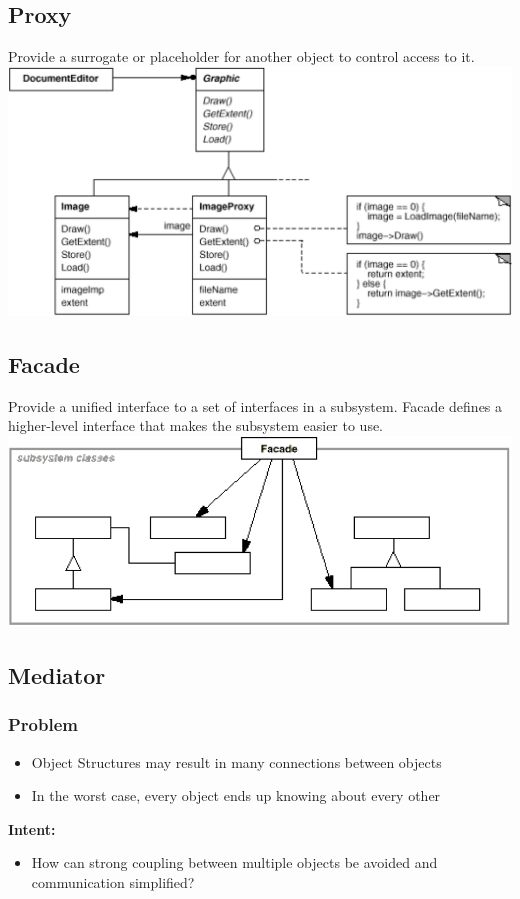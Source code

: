 \subsection{Proxy}
Provide a surrogate or placeholder for another object to control access to it.\\ 
\includegraphics[width=\linewidth]{./img/proxy.png}

\subsection{Facade}
Provide a unified interface to a set of interfaces in a subsystem. Facade defines a higher-level interface that makes the subsystem easier to use.\\ 
\includegraphics[width=\linewidth]{./img/facade.png}

\subsection{Mediator}
\subsubsection{Problem}
\begin{itemize}
    \item Object Structures may result in many connections between objects
    \item In the worst case, every object ends up knowing about every other
\end{itemize}
\textbf{Intent:}
\begin{itemize}
    \item How can strong coupling between multiple objects be avoided and communication simplified?
\end{itemize}
